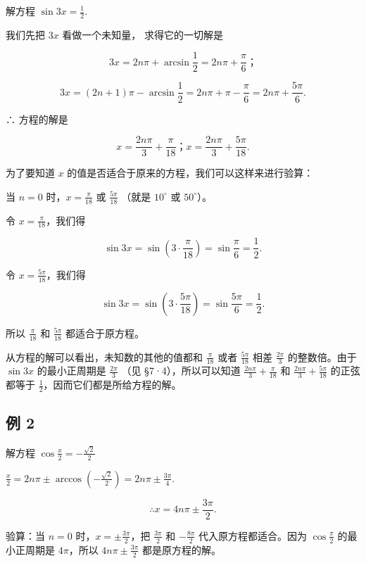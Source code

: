 解方程 \(\sin 3x = \frac{1}{2}\).

 我们先把 \(3x\) 看做一个未知量， 求得它的一切解是

\[
3 x = 2 n \pi + \arcsin \frac {1}{2} = 2 n \pi + \frac {\pi}{6}\text{；}
\]

\[
3 x = (2 n + 1) \pi - \arcsin \frac {1}{2} = 2 n \pi + \pi - \frac {\pi}{6} = 2 n \pi + \frac {5 \pi}{6}.
\]

∴ 方程的解是

\[
x = \frac {2 n \pi}{3} + \frac {\pi}{18}\text{；} x = \frac {2 n \pi}{3} + \frac {5 \pi}{18}.
\]

为了要知道 \(x\) 的值是否适合于原来的方程，我们可以这样来进行验算：

当 \(n = 0\) 时，\(x = \frac{\pi}{18}\) 或 \(\frac{5\pi}{18}\) （就是
\(10^{\circ}\) 或 \(50^{\circ}\)）。

令 \(x = \frac{\pi}{18}\)，我们得

\[
\sin 3 x = \sin \left(3 \cdot \frac {\pi}{18}\right) = \sin \frac {\pi}{6} = \frac {1}{2}.
\]

令 \(x = \frac{5\pi}{18}\)，我们得

\[
\sin 3 x = \sin \left(3 \cdot \frac {5 \pi}{18}\right) = \sin \frac {5 \pi}{6} = \frac {1}{2}.
\]

所以 \(\frac{\pi}{18}\) 和 \(\frac{5\pi}{18}\) 都适合于原方程。

从方程的解可以看出，未知数的其他的值都和 \(\frac{\pi}{18}\) 或者
\(\frac{5\pi}{18}\) 相差 \(\frac{2\pi}{3}\) 的整数倍。由于 \(\sin 3x\)
的最小正周期是 \(\frac{2\pi}{3}\) （见 §7·4），所以可以知道
\(\frac{2n\pi}{3} + \frac{\pi}{18}\) 和
\(\frac{2n\pi}{3} + \frac{5\pi}{18}\) 的正弦都等于
\(\frac{1}{2}\)，因而它们都是所给方程的解。

\subsection{例 2}

解方程 \(\cos \frac{x}{2} = -\frac{\sqrt{2}}{2}\)

\(\frac{x}{2} = 2n\pi \pm \arccos \left(-\frac{\sqrt{2}}{2}\right) = 2n\pi \pm \frac{3\pi}{4}\).

\[
\therefore x = 4 n \pi \pm \frac {3 \pi}{2}.
\]

验算：当 \(n = 0\) 时，\(x = \pm \frac{3\pi}{2}\)，把 \(\frac{3\pi}{2}\)
和 \(-\frac{8\pi}{2}\) 代入原方程都适合。因为 \(\cos \frac{\pi}{2}\)
的最小正周期是 \(4\pi\)，所以 \(4n\pi \pm \frac{3\pi}{2}\)
都是原方程的解。


